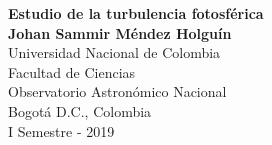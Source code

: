 \documentclass[12pt,letterpaper,oneside]{book}
\theoremstyle{plain}
\theoremstyle{definition}
\theoremstyle{remark}
\begin{document}
\frontmatter

\thispagestyle{empty}
\begin{center}
\textbf{{\LARGE Estudio de la turbulencia fotosférica}}\\[7cm]




\textbf{{\Large Johan Sammir Méndez Holguín}}\\[8cm]

Universidad Nacional de Colombia\\[2mm]
Facultad de Ciencias \\[2mm]
Observatorio Astronómico Nacional\\[2mm]
Bogotá D.C., Colombia\\[2mm]
I Semestre - 2019
\end{center}

\newpage\null\thispagestyle{empty}\newpage


\newpage
\end{document}
